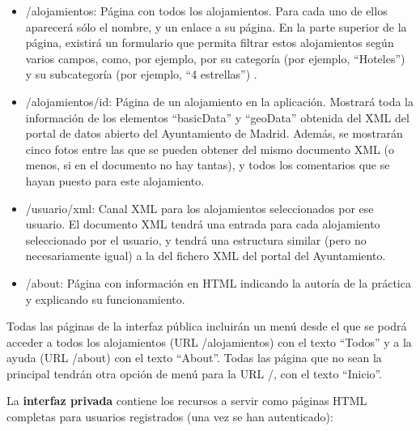 \begin{itemize}
  \item /alojamientos: Página con todos los alojamientos. Para cada uno de ellos aparecerá sólo el nombre, y un enlace a su página. En la parte superior de la página, existirá un formulario que permita filtrar estos alojamientos según varios campos, como, por ejemplo, por su categoría (por ejemplo, ``Hoteles'') y su subcategoría  (por ejemplo, ``4 estrellas'') .

  \item /alojamientos/{id}: Página de un alojamiento en la aplicación. Mostrará toda la información de los elementos ``basicData'' y ``geoData'' obtenida del XML del portal de datos abierto del Ayuntamiento de Madrid. Además, se mostrarán cinco fotos entre las que se pueden obtener del mismo documento XML (o menos, si en el documento no hay tantas), y todos los comentarios que se hayan puesto para este alojamiento.
  
  \item /{usuario}/xml: Canal XML para los alojamientos seleccionados por ese usuario. El documento XML tendrá una entrada para cada alojamiento seleccionado por el usuario, y tendrá una estructura similar (pero no necesariamente igual) a la del fichero XML del portal del Ayuntamiento.

  \item /about: Página con información en HTML indicando la autoría de la práctica y explicando su funcionamiento.

\end{itemize}

Todas las páginas de la interfaz pública incluirán un menú desde el que se podrá acceder a todos los alojamientos (URL /alojamientos) con el texto ``Todos'' y a la ayuda (URL /about) con el texto ``About''. Todas las página que no sean la principal tendrán otra opción de menú para la URL /, con el texto ``Inicio''.

La {\bf interfaz privada} contiene los recursos a servir como páginas HTML completas para usuarios registrados (una vez se han autenticado):

